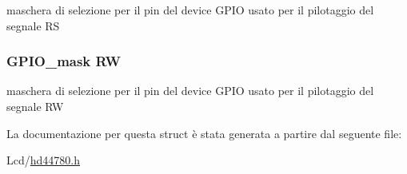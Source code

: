 maschera di selezione per il pin del device G\+P\+I\+O usato per il pilotaggio del segnale R\+S \hypertarget{struct_h_d44780___l_c_d__t_af8225e4a125a2159215dfa03372c305f}{
\subsubsection[{R\+W}]{\setlength{\rightskip}{0pt plus 5cm}G\+P\+I\+O\+\_\+mask R\+W}}\label{struct_h_d44780___l_c_d__t_af8225e4a125a2159215dfa03372c305f}
maschera di selezione per il pin del device G\+P\+I\+O usato per il pilotaggio del segnale R\+W 

La documentazione per questa struct è stata generata a partire dal seguente file\+:\begin{DoxyCompactItemize}
\item 
Lcd/\hyperlink{hd44780_8h}{hd44780.\+h}\end{DoxyCompactItemize}
